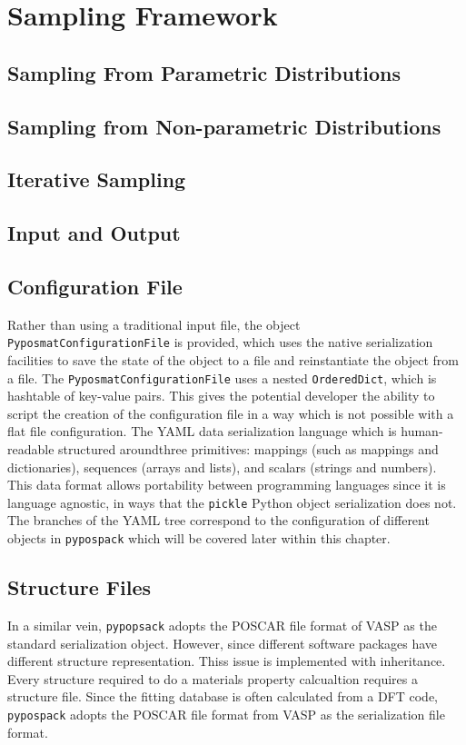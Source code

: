 \section{Sampling Framework}
\subsection{Sampling From Parametric Distributions}
\subsection{Sampling from Non-parametric Distributions}
\subsection{Iterative Sampling}

\subsection{Input and Output}

\subsection{Configuration File}
Rather than using a traditional input file, the object \verb|PyposmatConfigurationFile| is provided, which uses the native serialization facilities to save the state of the object to a file and reinstantiate the object from a file.  The \verb|PyposmatConfigurationFile| uses a nested \verb|OrderedDict|, which is hashtable of key-value pairs.  This gives the potential developer the ability to script the creation of the configuration file in a way which is not possible with a flat file configuration.  The YAML data serialization language\cite{yaml_version_1_2r} which is human-readable structured aroundthree primitives: mappings (such as mappings and dictionaries), sequences (arrays and lists), and scalars (strings and numbers).  This data format allows portability between programming languages since it is language agnostic, in ways that the \verb|pickle| Python object serialization does not.  The branches of the YAML tree correspond to the configuration of different objects in \verb|pypospack| which will be covered later within this chapter.

\subsection{Structure Files}
In a similar vein, \verb|pypopsack| adopts the POSCAR file format of VASP as the standard serialization object.  However, since different software packages have different structure representation.  Thiss issue is implemented with inheritance.
Every structure required to do a materials property calcualtion requires a structure file.  Since the fitting database is often calculated from a DFT code, \verb|pypospack| adopts the POSCAR file format from VASP as the serialization file format.

